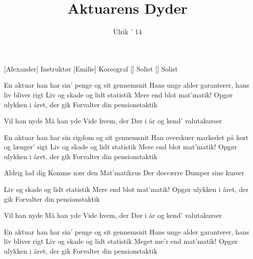 \documentclass[a4paper,11pt]{article}
\title{Aktuarens Dyder}
\author{Ulrik ' 14}
\begin{document}
\maketitle

\begin{roles}
[Alexander] Instruktør
[Emilie] Koreograf
[] Solist
[] Solist

\end{roles}

\begin{song}
 En aktuar han har sin' penge og sit gennemsnit
 Hans unge alder garanterer, hans liv bliver rigt
 Liv og skade og lidt statistik 
 Mere end blot mat'matik!
 Opgør ulykken i året, der gik
 Forvalter din pensionstaktik

 Vil han nyde
 Må han yde
 Vide hvem, der
 Dør i år
 og kend' valutakurser

 En aktuar han har sin rigdom og sit gennemsnit
 Han overskuer markedet på kort og længer' sigt
 Liv og skade og lidt statistik
 Mere end blot mat'matik!
 Opgør ulykken i året, der gik
 Forvalter din pensionstaktik

 Aldrig lad dig
 Komme nær den
 Mat'matikrus
 Der desværre
 Dumper sine kurser

 Liv og skade og lidt statistik 
 Mere end blot mat'matik!
 Opgør ulykken i året, der gik
 Forvalter din pensionstaktik

 Vil han nyde
 Må han yde
 Vide hvem, der
 Dør i år
 og kend' valutakurser

 En aktuar han har sin' penge og sit gennemsnit
 Hans unge alder garanterer, hans liv bliver rigt
 Liv og skade og lidt statistik
 Meget me'r end mat'matik!
 Opgør ulykken i året, der gik
 Forvalter din pensionstaktik




\end{song}
\end{document}
